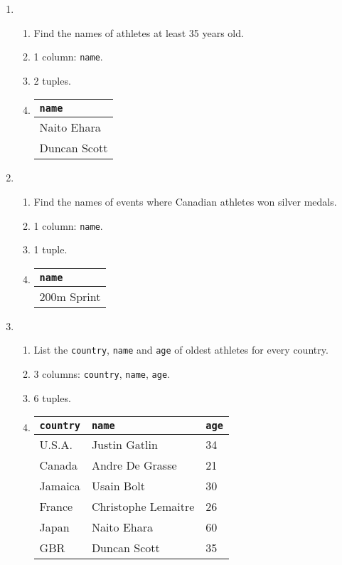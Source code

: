 \documentclass{homework}
\begin{document}
\begin{enumerate}
    \item
    \begin{enumerate}
        \item Find the names of athletes at least 35 years old.
        \item 1 column: \texttt{name}.
        \item 2 tuples.
        \item 
        \begin{tabular}{@{}l@{}}
            \toprule
            \texttt{name} \\ \midrule
            Naito Ehara   \\
            Duncan Scott  \\ \bottomrule
        \end{tabular}
    \end{enumerate}

    \item
    \begin{enumerate}
        \item Find the names of events where Canadian athletes won silver medals.
        \item 1 column: \texttt{name}.
        \item 1 tuple.
        \item
        \begin{tabular}{@{}l@{}}
            \toprule
            \texttt{name} \\ \midrule
            200m Sprint   \\ \bottomrule
        \end{tabular}
    \end{enumerate}

    \item
    \begin{enumerate}
        \item List the \texttt{country}, \texttt{name} and \texttt{age} of oldest athletes for every country.
        \item 3 columns: \texttt{country}, \texttt{name}, \texttt{age}.
        \item 6 tuples.
        \item
        \begin{tabular}{@{}lll@{}}
            \toprule
            \texttt{country} & \texttt{name}       & \texttt{age} \\ \midrule
            U.S.A.           & Justin Gatlin       & 34           \\
            Canada           & Andre De Grasse     & 21           \\
            Jamaica          & Usain Bolt          & 30           \\
            France           & Christophe Lemaitre & 26           \\
            Japan            & Naito Ehara         & 60           \\
            GBR              & Duncan Scott        & 35           \\ \bottomrule
        \end{tabular}
    \end{enumerate}
\end{enumerate}
\end{document}
